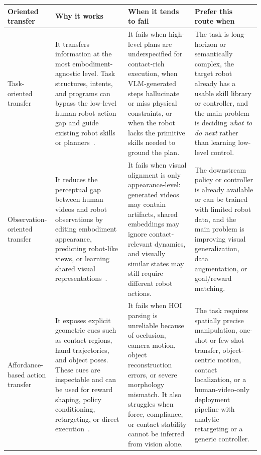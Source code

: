 \documentclass[Afour,sageh,times]{sagej}
\begin{document}
\begin{table}[t]
\centering
\scriptsize
\setlength{\tabcolsep}{3pt}
\renewcommand{\arraystretch}{1.15}
\begin{tabularx}{\textwidth}{
>{\raggedright\arraybackslash}p{2.3cm}
X
X
X
}
\toprule
Oriented transfer & Why it works & When it tends to fail & Prefer this route when \\
\midrule
Task-oriented transfer &
It transfers information at the most embodiment-agnostic level. Task structures, intents, and programs can bypass the low-level human-robot action gap and guide existing robot skills or planners~\citep{ding2024knowledge,wake2024gpt,wang2024vlm,ye2025watch}. &
It fails when high-level plans are underspecified for contact-rich execution, when VLM-generated steps hallucinate or miss physical constraints, or when the robot lacks the primitive skills needed to ground the plan. &
The task is long-horizon or semantically complex, the target robot already has a usable skill library or controller, and the main problem is deciding \textit{what to do next} rather than learning low-level control. \\
\midrule
Observation-oriented transfer &
It reduces the perceptual gap between human videos and robot observations by editing embodiment appearance, predicting robot-like views, or learning shared visual representations~\citep{nair2022r3m,li2024ag2manip,lepert2025masquerade,li2025h2r}. &
It fails when visual alignment is only appearance-level: generated videos may contain artifacts, shared embeddings may ignore contact-relevant dynamics, and visually similar states may still require different robot actions. &
The downstream policy or controller is already available or can be trained with limited robot data, and the main problem is improving visual generalization, data augmentation, or goal/reward matching. \\
\midrule
Affordance-based action transfer &
It exposes explicit geometric cues such as contact regions, hand trajectories, and object poses. These cues are inspectable and can be used for reward shaping, policy conditioning, retargeting, or direct execution~\citep{bahl2023affordances,bharadhwaj2024track2act,kuang2024ram,chen2025vidbot,zhang2025actron3d}. &
It fails when HOI parsing is unreliable because of occlusion, camera motion, object reconstruction errors, or severe morphology mismatch. It also struggles when force, compliance, or contact stability cannot be inferred from vision alone. &
The task requires spatially precise manipulation, one-shot or few-shot transfer, object-centric motion, contact localization, or a human-video-only deployment pipeline with analytic retargeting or a generic controller. \\

\end{tabularx}
\end{table}
\end{document}
